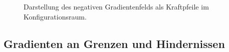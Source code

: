 \begin{figure}[H]
	\centering
	\footnotesize
	\centerline{}
	\caption{Darstellung des negativen Gradientenfelds als Kraftpfeile im Konfigurationsraum.}
\end{figure}

\subsection{Gradienten an Grenzen und Hindernissen}

